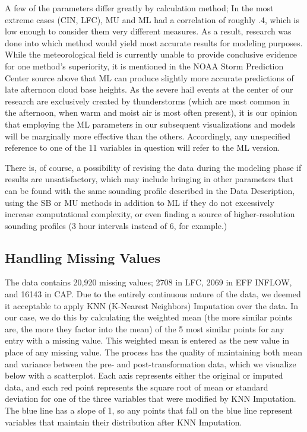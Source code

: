 \documentclass[fleqn,10pt]{SelfArx} %
\begin{document}
A few of the parameters differ greatly by calculation method; In the most extreme cases (CIN, LFC), MU and ML had a correlation of roughly .4, which is low enough to consider them very different measures. As a result, research was done into which method would yield most accurate results for modeling purposes. While the meteorological field is currently unable to provide conclusive evidence for one method's superiority, it is mentioned in the NOAA Storm Prediction Center source above that ML can produce slightly more accurate predictions of late afternoon cloud base heights. As the severe hail events at the center of our research are exclusively created by thunderstorms (which are most common in the afternoon, when warm and moist air is most often present), it is our opinion that employing the ML parameters in our subsequent visualizations and models will be marginally more effective than the others. Accordingly, any unspecified reference to one of the 11 variables in question will refer to the ML version.

There is, of course, a possibility of revising the data during the modeling phase if results are unsatisfactory, which may include bringing in other parameters that can be found with the same sounding profile described in the Data Description, using the SB or MU methods in addition to ML if they do not excessively increase computational complexity, or even finding a source of higher-resolution sounding profiles (3 hour intervals instead of 6, for example.)

\clearpage

\subsection{Handling Missing Values}

The data contains 20,920 missing values; 2708 in LFC, 2069 in EFF INFLOW, and 16143 in CAP. Due to the entirely continuous nature of the data, we deemed it acceptable to apply KNN (K-Nearest Neighbors) Imputation over the data. In our case, we do this by calculating the weighted mean (the more similar points are, the more they factor into the mean) of the 5 most similar points for any entry with a missing value. This weighted mean is entered as the new value in place of any missing value. The process has the quality of maintaining both mean and variance between the pre- and post-transformation data, which we visualize below with a scatterplot. Each axis represents either the original or imputed data, and each red point represents the square root of mean or standard deviation for one of the three variables that were modified by KNN Imputation. The blue line has a slope of 1, so any points that fall on the blue line represent variables that maintain their distribution after KNN Imputation.
\end{document}
